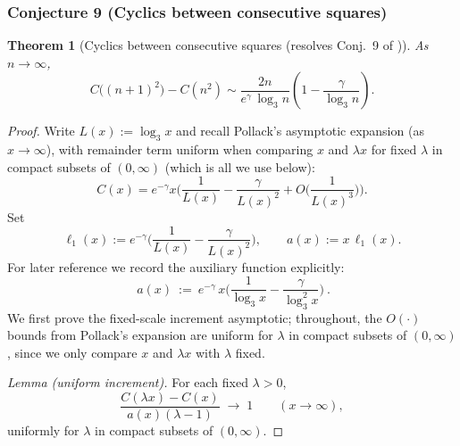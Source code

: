 \documentclass[12pt]{article}
\newtheorem{theorem}{Theorem}
\theoremstyle{remark}
\begin{document}


\subsubsection{Conjecture 9 (Cyclics between consecutive squares)}
\begin{theorem}[Cyclics between consecutive squares (resolves Conj.~9 of \cite{Cohen2025})]\label{thm:squares}
As $n\to\infty$,
\[
 C\big((n+1)^2\big) - C(n^2) \sim \frac{2n}{e^{\gamma}\,\log_3 n}\left(1-\frac{\gamma}{\log_3 n}\right).
\]
\end{theorem}

\begin{proof}
Write $L(x):=\log_3 x$ and recall Pollack's asymptotic expansion (as $x\to\infty$), with remainder term uniform when comparing $x$ and $\lambda x$ for fixed $\lambda$ in compact subsets of $(0,\infty)$ (which is all we use below):
\[
 C(x)=e^{-\gamma}x\Big(\frac{1}{L(x)}-\frac{\gamma}{L(x)^2}+O\Big(\frac{1}{L(x)^3}\Big)\Big).
\]
Set
\[
 \ell_1(x):=e^{-\gamma}\Big(\frac{1}{L(x)}-\frac{\gamma}{L(x)^2}\Big),\qquad a(x):=x\,\ell_1(x).
\]
For later reference we record the auxiliary function explicitly:
\begin{equation}\label{eq:aux-a}
 \boxed{\ a(x)\ :=\ e^{-\gamma}\,x\Big(\frac{1}{\log_3 x}-\frac{\gamma}{\log_3^2 x}\Big)\ }.
\end{equation}
We first prove the fixed-scale increment asymptotic; throughout, the $O(\cdot)$ bounds from Pollack's expansion are uniform for $\lambda$ in compact subsets of $(0,\infty)$, since we only compare $x$ and $\lambda x$ with $\lambda$ fixed.

\textit{Lemma (uniform increment).} For each fixed $\lambda>0$,
\[
 \frac{C(\lambda x)-C(x)}{a(x)(\lambda-1)}\;\longrightarrow\;1\qquad (x\to\infty),
\]
uniformly for $\lambda$ in compact subsets of $(0,\infty)$.


\end{proof}
\end{document}
